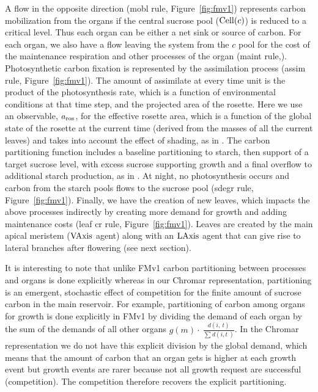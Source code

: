 A flow in the opposite direction (\textsf{mobl} rule, Figure~\ref{fig:fmv1})
represents carbon mobilization from the organs if the central sucrose pool
(\(\mathrm{Cell}(c)\)) is reduced to a critical level. Thus each organ can be either
a net sink or source of carbon. For each organ, we also have a flow leaving the
system from the \(c\) pool for the cost of the maintenance respiration and other
processes of the organ (maint rule,). Photosynthetic carbon fixation is
represented by the assimilation process (\textsf{assim} rule,
Figure~\ref{fig:fmv1}). The amount of assimilate at every time unit is the
product of the photosynthesis rate, which is a function of environmental
conditions at that time step, and the projected area of the rosette. Here we use
an observable, \(a_{\mathrm{ros}}\), for the effective rosette area, which is a
function of the global state of the rosette at the current time (derived from
the masses of all the current leaves) and takes into account the effect of
shading, as in \citet{chew_multiscale_2014}. The carbon partitioning function
includes a baseline partitioning to starch, then support of a target sucrose
level, with excess sucrose supporting growth and a final overflow to additional
starch production, as in \citet{chew_multiscale_2014}. At night, no
photosynthesis occurs and carbon from the starch pools flows to the sucrose pool
(\textsf{sdegr} rule, Figure~\ref{fig:fmv1}). Finally, we have the creation of
new leaves, which impacts the above processes indirectly by creating more demand
for growth and adding maintenance costs (\textsf{leaf cr} rule,
Figure~\ref{fig:fmv1}). Leaves are created by the main apical meristem
(\(\mathrm{VAxis}\) agent) along with an \(\mathrm{LAxis}\) agent that can give rise to
lateral branches after flowering (see next section).

It is interesting to note that unlike FMv1 carbon partitioning between
processes and organs is done explicitly whereas in our Chromar
representation, partitioning is an emergent, stochastic effect of
competition for the finite amount of sucrose carbon in the main
reservoir. For example, partitioning of carbon among organs for growth
is done explicitly in FMv1 by dividing the demand of each organ by the
sum of the demands of all other organs
\(g( m ) \cdot \ \frac{d(i,\ t)}{\sum_{}^{}{d(i,t\ )}}\). In
the Chromar representation we do not have this explicit division by the
global demand, which means that the amount of carbon that an organ gets
is higher at each growth event but growth events are rarer because not
all growth request are successful (competition). The competition
therefore recovers the explicit partitioning.

